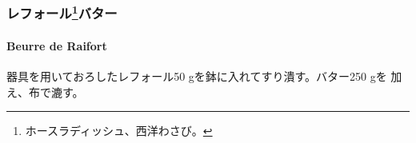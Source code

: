 \begin{recette}
\maeaki

\hypertarget{ux30ecux30d5ux30a9ux30fcux30eb38ux30d0ux30bfux30fc}{%
\subsubsection[レフォールバター]{\texorpdfstring{レフォール\footnote{ホースラディッシュ、西洋わさび。}バター}{レフォールバター}}\label{ux30ecux30d5ux30a9ux30fcux30eb38ux30d0ux30bfux30fc}}

\hypertarget{beurre-de-raifort}{%
\paragraph{Beurre de Raifort}\label{beurre-de-raifort}}


器具を用いておろしたレフォール50 gを鉢に入れてすり潰す。バター250 gを
加え、布で漉す。
\end{recette}